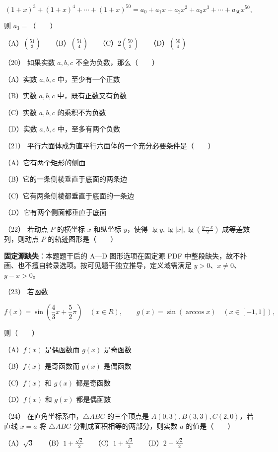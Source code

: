\begin{answer}
\nopagebreak[4]
\[
(1+x)^3+(1+x)^4+\cdots+(1+x)^{50}
=a_0+a_1x+a_2x^2+a_3x^3+\cdots+a_{50}x^{50},
\]

则 $a_3=$\mbox{（　　）}

（A）$\binom{51}{3}$　　（B）$\binom{51}{4}$　　（C）$2\binom{50}{3}$　　（D）$\binom{50}{4}$

（20） 如果实数 $a,b,c$ 不全为负数，那么\mbox{（　　）}

（A）实数 $a,b,c$ 中，至少有一个正数

（B）实数 $a,b,c$ 中，既有正数又有负数

（C）实数 $a,b,c$ 的乘积不为负数

（D）实数 $a,b,c$ 中，至多有两个负数

（21） 平行六面体成为直平行六面体的一个充分必要条件是\mbox{（　　）}

（A）它有两个矩形的侧面

（B）它的一条侧棱垂直于底面的两条边

（C）它有两条侧棱都垂直于底面的一条边

（D）它有两个侧面都垂直于底面

（22） 若动点 $P$ 的横坐标 $x$ 和纵坐标 $y$，使得 $\lg y,\lg|x|,\lg\left(\frac{y-x}{2}\right)$ 成等差数列，则动点 $P$ 的轨迹图形是\mbox{（　　）}

\begin{gktip}
\textbf{固定源缺失}：本题题干后的 A—D 图形选项在固定源 PDF 中整段缺失，故不补画、也不擅自转录选项。按可见题干独立推导，定义域需满足 $y>0$、$x\ne0$、$y-x>0$。
\end{gktip}

（23） 若函数

\nopagebreak[4]
\[
f(x)=\sin\left(\frac43x+\frac52\pi\right)\quad(x\in R),
\qquad
g(x)=\sin(\arccos x)\quad(x\in[-1,1]),
\]

则\mbox{（　　）}

（A）$f(x)$ 是偶函数而 $g(x)$ 是奇函数

（B）$f(x)$ 是奇函数而 $g(x)$ 是偶函数

（C）$f(x)$ 和 $g(x)$ 都是奇函数

（D）$f(x)$ 和 $g(x)$ 都是偶函数

（24） 在直角坐标系中，$\triangle ABC$ 的三个顶点是 $A(0,3),B(3,3),C(2,0)$，若直线 $x=a$ 将 $\triangle ABC$ 分割成面积相等的两部分，则实数 $a$ 的值是\mbox{（　　）}

（A）$\sqrt3$　　（B）$1+\frac{\sqrt2}{2}$　　（C）$1+\frac{\sqrt3}{3}$　　（D）$2-\frac{\sqrt2}{2}$


\end{answer}
